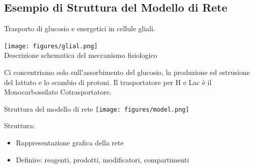 \documentclass{article}
\begin{document}
\subsection{Esempio di Struttura del Modello di Rete}
Trasporto di glucosio e energetici in cellule gliali.\\
\begin{minipage}[c]{.5\textwidth}
    \raggedright
    \texttt{[image: figures/glial.png]}\\
    Descrizione schematica del meccanismo fisiologico
\end{minipage}%
\begin{minipage}[c]{.5\textwidth}
    \raggedleft
    Ci concentriamo solo sull'assorbimento del glucosio, la produzione ed estrusione del lattato e lo scambio di protoni. Il trasportatore per H e Lac è il Monocarbossilato Cotrasportatore.
\end{minipage}
\begin{flushright}
    Struttura del modello di rete 
    \texttt{[image: figures/model.png]}
\end{flushright}
Struttura:
\begin{itemize}
    \item Rappresentazione grafica della rete
    \item Definire: reagenti, prodotti, modificatori, compartimenti
\end{itemize}
\end{document}

